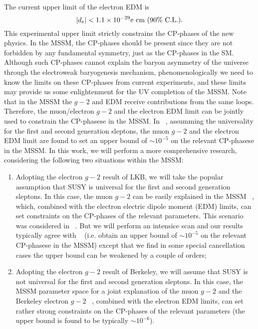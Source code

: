 \documentclass[a4paper,11pt]{article}
\begin{document}
   The current upper limit of the electron EDM is~\cite{ACME:2018yjb}
   \begin{equation}\label{eq:electronEDM}
       |d_e|<1.1\times 10^{-29}{\rm e~cm}~(\text{90\% C.L.}).
   \end{equation}
   This experimental upper limit strictly constrains the CP-phases of the new physics. In the MSSM, the CP-phases should be present since they are not forbidden by any fundamental symmetry, just as the CP-phases in the SM.  Although such CP-phases cannot explain the baryon asymmetry of the universe through the electroweak baryogenesis mechanism, phenomenologically we need to know the limits on these CP-phases from current experiments, and these limits may provide us some enlightenment for the UV completion of the MSSM. Note that in the MSSM the $g-2$ and EDM receive contributions from  the same loops. Therefore, the muon/electron $g-2$ and the electron EDM limit can be jointly used to constrain the CP-phasese in the MSSM. In ~\cite{Han:2021ify}, assumming the universality for the first and second generation sleptons, the muon $g-2$ and the electron EDM limit are found to set an upper bound of $\sim 10^{-5}$ on the relevant CP-phasese in the MSSM.  In this work, we will perform a more comprehensive research, considering 
  the following two situations within the MSSM:
   \begin{enumerate}
       \item Adopting the electron $g-2$ result of LKB, we will take the popular assumption that SUSY is universal for the first and second generation sleptons. In this case, the muon $g-2$ can be easily explained in the MSSM ~\cite{Martin:2001st}, which, combined with the electron electric dipole moment (EDM) limits, can set constraints on the CP-phases of the relevant parameters. This scenario was considered in ~\cite{Han:2021ify}. But we will perform an intensice scan and our results typically agree with ~\cite{Han:2021ify} (i.e. obtain an upper bound of $\sim 10^{-5}$ on the relevant CP-phasese in the MSSM) except that we find in some special cancellation cases the upper bound can be weakened by a couple of orders;  
       \item Adopting the electron $g-2$ result of Berkeley, we will assume that SUSY is not universal for the first and second generation sleptons. In this case, the MSSM parameter space for a joint explanation of the muon $g-2$ and the Berkeley electron $g-2$ ~\cite{Badziak:2019gaf,Li:2021koa}, combined with the electron EDM limits, can set rather strong constraints on the CP-phases of the relevant parameters (the upper bound is found to be typically $\sim 10^{-6}$).  
   \end{enumerate}
\end{document}
